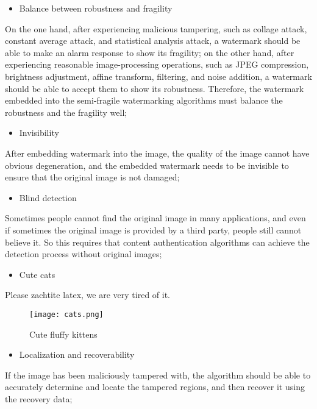 \documentclass[a4paper, 12pt]{gji}
\begin{document}
\begin{itemize}
    \item Balance between robustness and fragility
\end{itemize}
\qquad On the one hand, after experiencing malicious tampering, such as collage attack, constant average attack, and statistical analysis attack, a watermark should be able to make an alarm response to show its fragility; on the other hand, after experiencing reasonable image-processing operations, such as JPEG compression, brightness adjustment, affine transform, filtering, and noise addition, a watermark should be able to accept them to show its robustness. Therefore, the watermark embedded into the semi-fragile watermarking algorithms must balance the robustness and the fragility well;

\begin{itemize}
    \item Invisibility
\end{itemize}
\qquad After embedding watermark into the image, the quality of the image cannot have obvious degeneration, and the embedded watermark needs to be invisible to ensure that the original image is not damaged;

\begin{itemize}
    \item Blind detection
\end{itemize}
\qquad Sometimes people cannot find the original image in many applications, and even if sometimes the original image is provided by a third party, people still cannot believe it. So this requires that content authentication algorithms can achieve the detection process without original images;

\begin{itemize}
    \item Cute cats
\end{itemize}
\qquad Please zachtite latex, we are very tired of it.
\begin{figure}[H]
    \centering
    \texttt{[image: cats.png]}
    \caption{Cute fluffy kittens}
    \label{Lena}
\end{figure}

\begin{itemize}
    \item Localization and recoverability
\end{itemize}
\qquad If the image has been maliciously tampered with, the algorithm should be able to accurately determine and locate the tampered regions, and then recover it using the recovery data;
\end{document}
